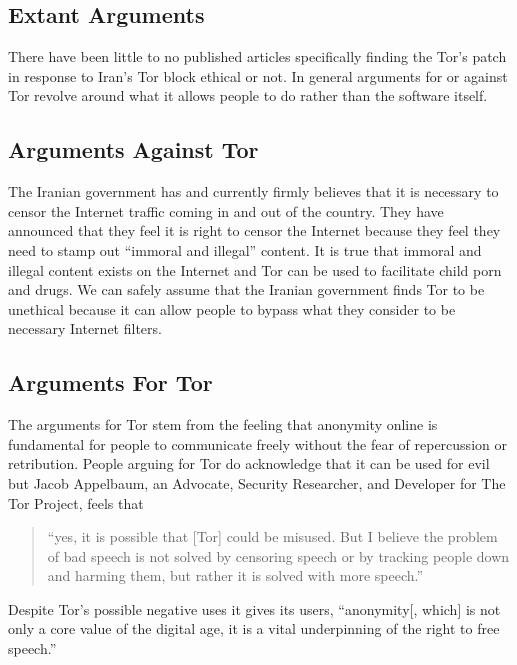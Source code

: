 \documentclass[11pt]{article}
\begin{document}
\begin{multicols}{2}
\section{Extant Arguments} 

There have been little to no published articles specifically finding the Tor's
patch in response to Iran's Tor block ethical or not. In general arguments for
or against Tor revolve around what it allows people to do rather than the
software itself.

\subsection{Arguments Against Tor}

The Iranian government has and currently firmly believes that it is necessary to
censor the Internet traffic coming in and out of the country. They have
announced that they feel it is right to censor the Internet because they feel
they need to stamp out ``immoral and illegal''
content.\cite{CensorshipFearsRise} It is true that immoral and illegal content
exists on the Internet and Tor can be used to facilitate child porn and
drugs.\cite{Tor:ChildPorn, Tor:SilkRoad} We can safely assume that the Iranian
government finds Tor to be unethical because it can allow people to bypass what
they consider to be necessary Internet filters.\cite{IranBlocksTorSameDayFix}

\subsection{Arguments For Tor}

The arguments for Tor stem from the feeling that anonymity online is fundamental
for people to communicate freely without the fear of repercussion or
retribution.\cite{Tor:ArgumentForAppelbaum} People arguing for Tor do
acknowledge that it can be used for evil but Jacob Appelbaum, an Advocate,
Security Researcher, and Developer for The Tor Project, feels that
\begin{quotation} 
  
  ``yes, it is possible that [Tor] could be misused. But I believe the problem
  of bad speech is not solved by censoring speech or by tracking people down and
  harming them, but rather it is solved with more
  speech.''\cite{Tor:ArgumentForAppelbaum}

\end{quotation}
Despite Tor's possible negative uses it gives its users, 
``anonymity[, which] is not only a core value of the digital age, it is a vital
underpinning of the right to free speech.''\cite{TorCreatesSaferInternet}


\end{multicols}
\end{document}
